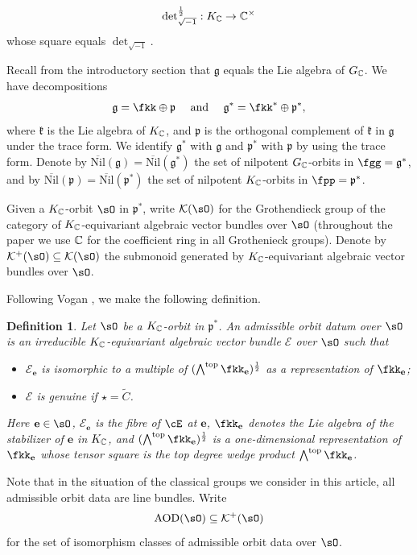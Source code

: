 \documentclass[11pt,a4paper]{amsart}
\newcommand{\CE}{{\mathcal {E}}}
\newcommand{\CK}{{\mathcal {K}}}
\newcommand{\g}{\mathfrak g}
\newcommand{\p}{\mathfrak p}
\newcommand{\be}{\begin {equation}}
\newcommand{\ee}{\end {equation}}
\numberwithin{equation}{section}
\newtheorem{defn}[thm]{Definition}
\theoremstyle{remark}
\def\subset{\subseteq}
\def\Nil{\overline{\mathrm{Nil}}}
\begin{document}
\be\label{dethalf}
{\det}_{\sqrt{-1}}^{\frac{1}{2}}:  K_{\C}\rightarrow \C^\times
\ee
whose square equals $\det_{\sqrt{-1}}$.


Recall from the introductory section that $\g$ equals  the Lie algebra of $G_{\mathbb{C}}$.
We have  decompositions
\[
\g=\fkk \oplus \p
\quad \text{ and } \quad
\g^*=\fkk^*\oplus \p^*,
\]
where $\mathfrak k$ is the Lie algebra of $K_{\mathbb{C}}$, and $\p$ is the orthogonal complement of $\mathfrak k$ in $\g$ under the trace form.
We identify $\g^*$ with $\g$ and $\p^*$ with $\p$ by using the trace form.
Denote by $\Nil(\g)=\Nil(\g^*)$ the set of nilpotent $G_{\mathbb{C}}$-orbits in $\fgg=\g^*$, and by
$\Nil(\p)=\Nil(\p^*)$ the set of nilpotent $K_{\mathbb{C}}$-orbits in $\fpp=\p^*$.

Given a $K_{\mathbb{C}}$-orbit $\sO$ in $\p^*$, write $\CK(\sO)$ for the Grothendieck group of the category of
$K_{\mathbb{C}}$-equivariant algebraic vector bundles  over $\sO$ (throughout the paper we use $\mathbb{C}$ for the coefficient ring in all Grothenieck groups). Denote by $\CK^+(\sO)\subset \CK(\sO)$ the submonoid generated by $K_{\mathbb{C}}$-equivariant algebraic vector bundles over $\sO$.

Following Vogan \cite[Definition 7.13]{Vo89}, we make the following definition.
\begin{defn}\label{defaod}
  Let $\sO$ be a $K_{\mathbb{C}}$-orbit in $\p^*$. An admissible orbit datum over
  $\sO$ is an irreducible $K_{\mathbb{C}}$-equivariant algebraic vector bundle $\CE$
  over $\sO$ such that
  \begin{itemize}
    \item $\CE_\mathbf e$ is isomorphic to a multiple of
    $(\bigwedge^{\mathrm{top}} \fkk_\mathbf e )^{\frac{1}{2}}$ as a representation of
    $\fkk_\mathbf e$;
    \item $\CE$ is genuine if $\star=\widetilde C$.
  \end{itemize}
  Here $\mathbf e\in \sO$, $\CE_\mathbf e$ is the fibre of $\cE$ at $\mathbf e$, $\fkk_\mathbf e$
  denotes the Lie algebra of the stabilizer of $\mathbf e$ in $K_{\mathbb{C}}$, and
  $(\bigwedge^{\mathrm{top}} \fkk_\mathbf e)^{\frac{1}{2}}$ is a one-dimensional
  representation of $\fkk_\mathbf e$ whose tensor square is the top degree wedge
  product $\bigwedge^{\mathrm{top}} \fkk_\mathbf e$.
\end{defn}
Note that in the situation of the classical groups we consider in this article, all admissible
orbit data are line bundles.
Write
\[
\mathrm{AOD}(\sO)\subset \CK^+(\sO)
\]
for the set of isomorphism classes of admissible orbit data over $\sO$.
\end{document}
